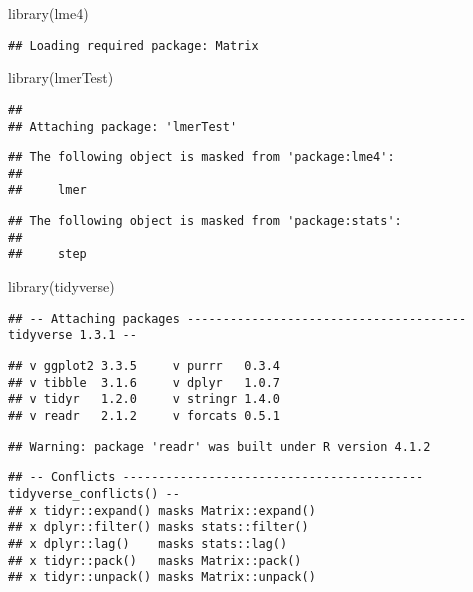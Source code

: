 \documentclass[
]{article}
\newenvironment{Shaded}{\begin{snugshade}}{\end{snugshade}}
\newcommand{\FunctionTok}[1]{\textcolor[rgb]{0.00,0.00,0.00}{#1}}
\newcommand{\NormalTok}[1]{#1}
\begin{document}
\begin{Shaded}
\begin{Highlighting}[]
\FunctionTok{library}\NormalTok{(lme4)}
\end{Highlighting}
\end{Shaded}

\begin{verbatim}
## Loading required package: Matrix
\end{verbatim}

\begin{Shaded}
\begin{Highlighting}[]
\FunctionTok{library}\NormalTok{(lmerTest)}
\end{Highlighting}
\end{Shaded}

\begin{verbatim}
## 
## Attaching package: 'lmerTest'
\end{verbatim}

\begin{verbatim}
## The following object is masked from 'package:lme4':
## 
##     lmer
\end{verbatim}

\begin{verbatim}
## The following object is masked from 'package:stats':
## 
##     step
\end{verbatim}

\begin{Shaded}
\begin{Highlighting}[]
\FunctionTok{library}\NormalTok{(tidyverse)}
\end{Highlighting}
\end{Shaded}

\begin{verbatim}
## -- Attaching packages --------------------------------------- tidyverse 1.3.1 --
\end{verbatim}

\begin{verbatim}
## v ggplot2 3.3.5     v purrr   0.3.4
## v tibble  3.1.6     v dplyr   1.0.7
## v tidyr   1.2.0     v stringr 1.4.0
## v readr   2.1.2     v forcats 0.5.1
\end{verbatim}

\begin{verbatim}
## Warning: package 'readr' was built under R version 4.1.2
\end{verbatim}

\begin{verbatim}
## -- Conflicts ------------------------------------------ tidyverse_conflicts() --
## x tidyr::expand() masks Matrix::expand()
## x dplyr::filter() masks stats::filter()
## x dplyr::lag()    masks stats::lag()
## x tidyr::pack()   masks Matrix::pack()
## x tidyr::unpack() masks Matrix::unpack()
\end{verbatim}
\end{document}
